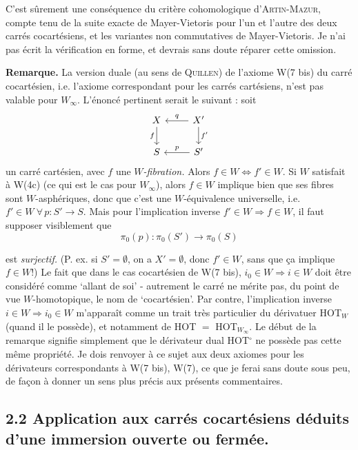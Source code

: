 \documentclass[11pt]{article}
\newcommand{\printedpage}[1]{\marginpar{\footnotesize p.~#1}}
\newcommand{\msp}[1]{\marginpar{\footnotesize [#1]}}
\begin{document}
C'est sûrement une conséquence du critère cohomologique d'\textsc{Artin-Mazur}, compte tenu de la suite exacte de Mayer-Vietoris pour l'un et l'autre des deux carrés cocartésiens, et les variantes non commutatives de Mayer-Vietoris. Je n'ai pas écrit la vérification en forme, et devrais sans doute réparer cette omission.

\msp{page 79}
\textbf{Remarque.} La version duale (au sens de \textsc{Quillen}) de l'axiome W(7 bis) du carré cocartésien, i.e. l'axiome correspondant pour les carrés cartésiens, n'est pas valable pour $W_\infty$. L'énoncé pertinent serait le suivant : soit
\[
\begin{tikzcd}
X & X' \arrow[l, "q"'] \arrow[d, "f'"] \\
S & S' \arrow[l, "p"']
\arrow[from=1-1, to=2-1, "f"']
\end{tikzcd}
\]
un carré cartésien, avec $f$ une \textit{$W$-fibration.} Alors $f\in W\Longleftrightarrow f'\in W$. Si $W$ satisfait à W(4c) (ce qui est le cas pour $W_\infty$), alors $f\in W$ implique bien que ses fibres sont $W$-asphériques, donc que c'est une $W$-équivalence universelle, i.e. $f'\in W\ \forall\, p:S'\longrightarrow S$. Mais pour l'implication inverse $f'\in W\Longrightarrow f\in W$, il faut supposer visiblement que
\[
\pi_0(p):\pi_0(S')\longrightarrow\pi_0(S)
\]

\printedpage{58}

est \textit{surjectif.} (P. ex. si $S'=\emptyset$, on a $X'=\emptyset$, donc $f'\in W$, sans que ça implique $f\in W$!) Le fait que dans le cas cocartésien de W(7 bis), $i_0\in W\Longrightarrow i\in W$ doit être considéré comme ‘allant de soi’ - autrement le carré ne mérite pas, du point de vue $W$-homotopique, le nom de ‘cocartésien’. Par contre, l’implication inverse $i\in W\Longrightarrow i_0\in W$ m’apparaît comme un trait très particulier du dérivatuer HOT$_W$ (quand il le possède), et notamment %
de HOT $=$ HOT$_{W_\infty}$. Le début
\msp{page 80}
de la remarque signifie simplement que le dérivateur dual HOT$^\circ$ ne possède pas cette même propriété. Je dois renvoyer à ce sujet aux deux axiomes pour les dérivateurs correspondants à W(7 bis), W(7), ce que je ferai sans doute sous peu, de façon à donner un sens plus précis aux présents commentaires.

\subsection*{2.2 Application aux carrés cocartésiens déduits d’une immersion ouverte ou fermée.}
\end{document}
